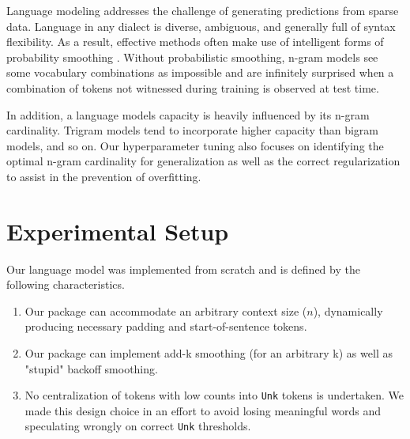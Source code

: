 \documentclass[11pt,a4paper]{article}
\begin{document}
Language modeling addresses the challenge of generating predictions from sparse data. Language in any
dialect is diverse, ambiguous, and generally full of syntax flexibility. As a result, effective methods 
often make use of intelligent forms of probability smoothing \cite{chen1999empirical}.
Without probabilistic smoothing, n-gram models see some vocabulary combinations as impossible \cite{jelinek1980interpolated} and are
infinitely surprised when a combination of tokens not witnessed during training is observed at test time.

In addition, a language models capacity is heavily influenced by its n-gram cardinality. Trigram models
tend to incorporate higher capacity than bigram models, and so on. Our hyperparameter tuning also focuses on 
identifying the optimal n-gram cardinality for generalization as well as the correct regularization to assist
in the prevention of overfitting.


\section{Experimental Setup}%
\label{sec:experimental_setup}

Our language model was implemented from scratch and is defined by the following 
characteristics. 
\begin{enumerate}
  \item Our package can accommodate an arbitrary context size ($n$), dynamically producing
    necessary padding and start-of-sentence tokens.
  \item Our package can implement add-k smoothing (for an arbitrary k) as well as
    "stupid" \cite{brants2007large} backoff smoothing.
  \item No centralization of tokens with low counts into \texttt{Unk} tokens is undertaken.
    We made this design choice in an effort to avoid losing meaningful words 
    and speculating wrongly on correct \texttt{Unk} thresholds.
\end{enumerate}
\end{document}
